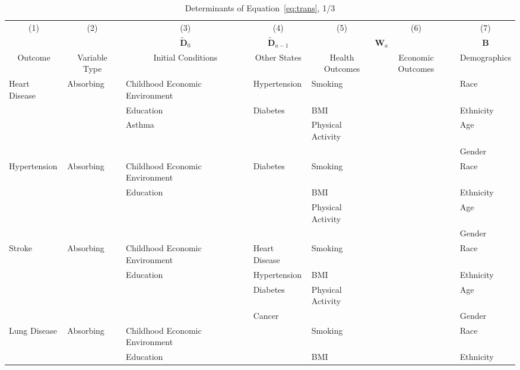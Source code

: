 \begin{table}
\caption{Determinants of Equation~\eqref{eq:trans}, 1/3} \label{table:supertab1}
\begin{scriptsize}
\begin{tabular}{lllllll}
\toprule 
\multicolumn{1}{c}{(1)} & \multicolumn{1}{c}{(2)} & \multicolumn{1}{c}{(3)} & \multicolumn{1}{c}{(4)} & \multicolumn{1}{c}{(5)} & \multicolumn{1}{c}{(6)} & \multicolumn{1}{c}{(7)} \\
 & &  \multicolumn{1}{c}{$\tilde{\bm{D}}_0$} &  \multicolumn{1}{c}{$\tilde{\bm{D}}_{a-1}$} & \multicolumn{2}{c}{ $\bm{W}_a$ } &  \multicolumn{1}{c}{$\bm{B}$} \\ 
\multicolumn{1}{c}{Outcome} & \multicolumn{1}{c}{Variable Type} & \multicolumn{1}{c}{Initial Conditions} & \multicolumn{1}{c}{Other States} & \multicolumn{1}{c}{Health Outcomes} & \multicolumn{1}{c}{Economic Outcomes} & \multicolumn{1}{c}{Demographics} \\
\midrule
Heart Disease   & Absorbing & Childhood Economic Environment & Hypertension    & Smoking   &                                & Race \\
			    &           & Education & Diabetes & BMI &  & Ethnicity \\
			    &           & Asthma & & Physical Activity &  & Age \\
			    &           &        &  &  &  & Gender \\
\midrule			
Hypertension & Absorbing & Childhood Economic Environment & Diabetes    & Smoking   &                                & Race \\
&           & Education &  & BMI &  & Ethnicity \\
&           &  & & Physical Activity &  & Age \\
&           &        &  &  &  & Gender \\
\midrule			
Stroke & Absorbing & Childhood Economic Environment & Heart Disease    & Smoking   &                                & Race \\
&           & Education & Hypertension & BMI &  & Ethnicity \\
&           &  & Diabetes & Physical Activity &  & Age \\
&           &        & Cancer &  &  & Gender \\
\midrule		
Lung Disease & Absorbing & Childhood Economic Environment &   & Smoking   &                                & Race \\
&           & Education & & BMI &  & Ethnicity \\

\end{tabular}
\end{scriptsize}
\end{table}
